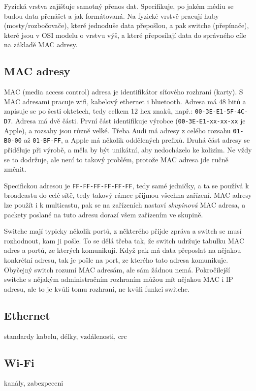 Fyzická vrstva zajišťuje samotný přenos dat. Specifikuje, po jakém médiu se budou data přenášet a jak formátovaná. Na fyzické vrstvě pracují huby (mosty/rozbočovače), které jednoduše data přepošlou, a pak switche (přepínače), které jsou v OSI modelu o vrstvu výš, a které přeposílají data do správného cíle na základě MAC adresy.

\subsection{MAC adresy}
MAC (media access control) adresa je identifikátor síťového rozhraní (karty). S MAC adresami pracuje wifi, kabelový ethernet i bluetooth. Adresa má 48 bitů a zapisuje se po šesti oktetech, tedy celkem 12 hex znaků, např.: \texttt{00-3E-E1-5F-4C-D7}. Adresa má dvě části. První část identifikuje výrobce (\texttt{00-3E-E1-xx-xx-xx} je Apple), a rozsahy jsou různě velké. Třeba Audi má adresy z celého rozsahu \texttt{01-B0-00} až \texttt{01-BF-FF}, a Apple má několik oddělených prefixů. Druhá část adresy se přiděluje při výrobě, a měla by být unikátní, aby nedocházelo ke kolizím. Ne vždy se to dodržuje, ale není to takový problém, protože MAC adresa jde ručně změnit.

Specifickou adresou je \texttt{FF-FF-FF-FF-FF-FF}, tedy samé jedničky, a ta se používá k broadcastu do celé sítě, tedy takový rámec přijmou všechna zařízení. MAC adresy lze použít i k multicastu, pak se na zařízeních nastaví \textit{skupinová} MAC adresa, a packety poslané na tuto adresu dorazí všem zařízením ve skupině.

Switche mají typicky několik portů, z některého přijde zpráva a switch se musí rozhodnout, kam ji pošle. To se dělá třeba tak, že switch udržuje tabulku MAC adres a portů, ze kterých komunikují. Když pak má data přeposlat na nějakou konkrétní adresu, tak je pošle na port, ze kterého tato adresa komunikuje. Obyčejný switch rozumí MAC adresám, ale sám žádnou nemá. Pokročilejší switche s nějakým administračním rozhraním můžou mít nějakou MAC i IP adresu, ale to je kvůli tomu rozhraní, ne kvůli funkci switche.

\subsection{Ethernet}
standardy kabelu, délky, vzdálenosti, crc

\subsection{Wi-Fi}
kanály, zabezpeceni

